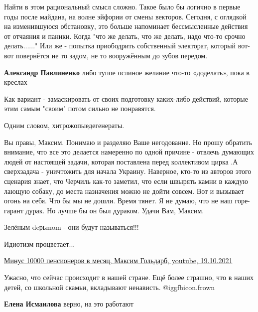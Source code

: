 \begin{itemize}

Найти в этом рациональный смысл сложно. Такое было бы логично в первые годы
после майдана, на волне эйфории от смены векторов. Сегодня, с оглядкой на
изменившуюся обстановку, это больше напоминает бессмысленные действия от
отчаяния и паники. Когда "что же делать, что же делать, надо что-то срочно
делать......" Или же - попытка приободрить собственный электорат, который
вот-вот повернётся не то задом, не то вооружённым до зубов передом.

\begin{itemize} %
\textbf{Александр Павлиненко} либо тупое ослиное желание что-то «доделать», пока в креслах

Как вариант - замаскировать от своих подготовку каких-либо действий, которые этим самым "своим" потом сильно не понравятся.
\end{itemize} %

Одним словом, хитрожопыедегенераты.


Вы правы, Максим. Понимаю и разделяю Ваше негодование. Но прошу обратить
внимание, что все это делается намеренно по одной причине - отвлечь думающих
людей от настоящей задачи, которая поставлена перед коллективом цирка .А
сверхзадача - уничтожить для начала Украину. Наверное, кто-то из авторов этого
сценария знает, что Черчиль как-то заметил, что если швырять камни в каждую
лающую собаку, до места назначения можно не дойти совсем. Вот и вызывает огонь
на себя. Что бы мы не дошли. Время тянет. Я не думаю, что не наш горе-гарант
дурак. Но лучше бы он был дураком. Удачи Вам, Максим.

Зелёным deрьmom - они будут называться!!!

Идиотизм процветает...


\href{https://youtu.be/0CaPyckOnC0}{%
Минус 10000 пенсионеров в месяц, Максим Гольдарб, youtube, 19.10.2021%
}


Ужасно, что сейчас происходит в нашей стране. Ещё более страшно, что в наших
детей, со школьной скамьи, вкладывают ненависть.  @igg{fbicon.frown} 

\begin{itemize} %
\textbf{Елена Исмаилова} верно, на это работают
\end{itemize} %


\end{itemize}
